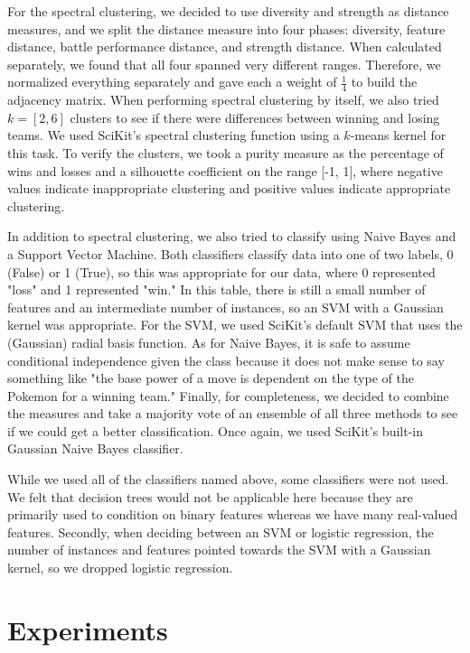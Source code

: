 \documentclass{acm_proc_article-sp}
\begin{document}
For the spectral clustering, we decided to use diversity and strength as distance measures, and we split the distance measure into four phases: diversity, feature distance, battle performance distance, and strength distance. When calculated separately, we found that all four spanned very different ranges. Therefore, we normalized everything separately and gave each a weight of $\frac{1}{4}$ to build the adjacency matrix. When performing spectral clustering by itself, we also tried $k=[2, 6]$ clusters to see if there were differences between winning and losing teams. We used SciKit's spectral clustering function using a $k$-means kernel for this task. To verify the clusters, we took a purity measure as the percentage of wins and losses and a silhouette coefficient on the range [-1, 1], where negative values indicate inappropriate clustering and positive values indicate appropriate clustering.

In addition to spectral clustering, we also tried to classify using Naive Bayes and a Support Vector Machine. Both classifiers classify data into one of two labels, 0 (False) or 1 (True), so this was appropriate for our data, where 0 represented "loss" and 1 represented "win." In this table, there is still a small number of features and an intermediate number of instances, so an SVM with a Gaussian kernel was appropriate. For the SVM, we used SciKit's default SVM that uses the (Gaussian) radial basis function. As for Naive Bayes, it is safe to assume conditional independence given the class because it does not make sense to say something like "the base power of a move is dependent on the type of the Pokemon for a winning team." Finally, for completeness, we decided to combine the measures and take a majority vote of an ensemble of all three methods to see if we could get a better classification. Once again, we used SciKit's built-in Gaussian Naive Bayes classifier.

While we used all of the classifiers named above, some classifiers were not used. We felt that decision trees would not be applicable here because they are primarily used to condition on binary features whereas we have many real-valued features. Secondly, when deciding between an SVM or logistic regression, the number of instances and features pointed towards the SVM with a Gaussian kernel, so we dropped logistic regression.

\section{Experiments}
\end{document}
